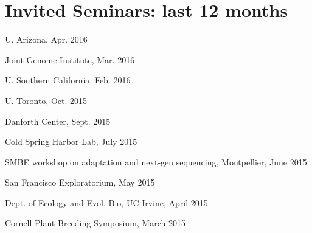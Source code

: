 \documentclass[letterpaper]{article}
\renewenvironment{itemize}{
  \begin{list}{}{
    \setlength{\leftmargin}{1.5em}
  }
}{
  \end{list}
}
\begin{document}
\section*{Invited Seminars: last 12 months}
\begin{itemize}
\item U. Arizona, Apr. 2016
\item Joint Genome Institute, Mar. 2016
\item U. Southern California, Feb. 2016
\item U. Toronto, Oct. 2015
\item Danforth Center, Sept. 2015
\item Cold Spring Harbor Lab, July 2015
\item SMBE workshop on adaptation and next-gen sequencing, Montpellier, June 2015
\item San Francisco Exploratorium, May 2015 
\item Dept. of Ecology and Evol. Bio, UC Irvine, April 2015
\item Cornell Plant Breeding Symposium, March 2015

\end{itemize}
\end{document}
